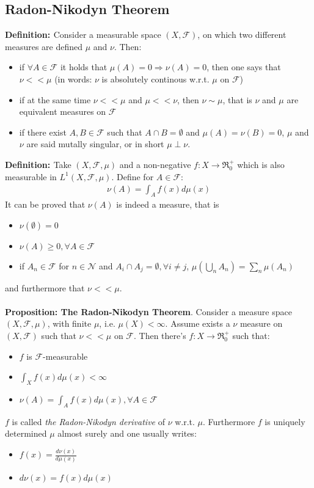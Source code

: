 \documentclass[a4paper,10pt]{report}
\theoremstyle{plain}
\theoremstyle{definition}
\newcommand\be{\begin{eqnarray}}    %
\newcommand\ee{\end{eqnarray}}
\newcommand{\DEF} {{\bf{Definition: }}}
\newcommand{\PROP} {{\bf{Proposition: }}}
\newcommand{\FF} {\mathcal{F} }
\begin{document}
\subsection{Radon-Nikodyn Theorem \label{radonnikodyn}}
\label{RADONTHEOREM}
\DEF Consider a measurable space $(X,\FF)$, on which two different measures are defined $\mu$ and $\nu$. Then:
\begin{itemize}
\item if $\forall A\in \FF$ it holds that $\mu(A)=0\Rightarrow\nu(A)=0$, then one says that $\nu<< \mu$ (in words: $\nu$ is absolutely continous w.r.t. $\mu$ on $\FF$) 
\item if at the same time $\nu<< \mu$ and $\mu<< \nu$, then $\nu\sim \mu$, that is $\nu$ and $\mu$ are equivalent measures on $\FF$
\item if there exist $A,B\in \FF$ such that $A\cap B=\emptyset$ and $\mu(A)=\nu(B)=0$, $\mu$ and $\nu$ are said mutally singular, or in short $\mu \perp \nu$.
\end{itemize}
\DEF Take $(X,\FF,\mu)$ and a non-negative $f:X\rightarrow \Re_0^+$ which is also measurable in $L^1(X,\FF,\mu)$. Define for $A\in \FF$:
\be
\nu(A)=\int_A f(x) d\mu(x)
\ee
It can be proved that $\nu(A)$ is indeed a measure, that is
\begin{itemize}
\item $\nu(\emptyset)=0$
\item $\nu(A)\geq 0, \forall A\in \FF$
\item if $A_n\in \FF$ for $n\in \mathcal{N}$ and $A_i \cap A_j=\emptyset,\forall i\not= j$, $\mu\left(\bigcup_n A_n\right)=\sum_n \mu(A_n)$ 
\end{itemize}
and furthermore that $\nu << \mu$.\\ \\
\PROP {\bf{The Radon-Nikodyn Theorem}}. Consider a measure space $(X,\FF,\mu)$, with finite $\mu$, i.e. $\mu(X)<\infty$. Assume exists a $\nu$ measure on $(X,\FF)$ such that $\nu <<\mu$ on $\FF$. Then there's $f:X\rightarrow \Re_0^+$ such that:
\begin{itemize}
\item $f$ is $\FF$-measurable
\item $\int_X f(x) d\mu(x)<\infty$
\item $\nu(A)=\int_A f(x)d\mu(x), \forall A\in \FF$
\end{itemize}
$f$ is called {\emph{the Radon-Nikodyn derivative}} of $\nu$ w.r.t. $\mu$.  Furthermore $f$ is uniquely determined $\mu$ almost surely and one usually writes:
\begin{itemize}
\item $f(x)=\frac{d\nu(x)}{d\mu(x)}$
\item $d\nu(x)=f(x)d\mu(x)$
\end{itemize}
\end{document}
